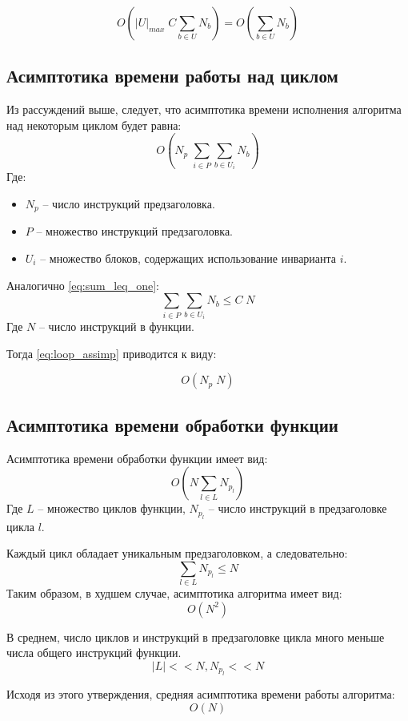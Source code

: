 $$ O(|U|_{max} \; C \sum_{b \in U} N_b) = O(\sum_{b \in U} N_b) $$

\subsection{Асимптотика времени работы над циклом}

Из рассуждений выше, следует, что асимптотика времени исполнения алгоритма над некоторым циклом будет равна:
\begin{equation} \label{eq:loop_assimp}
O(N_p \; \sum_{i \in P} {\sum_{b \in U_i} N_b})
\end{equation}
Где:
\begin{itemize}
    \item $N_p$ -- число инструкций предзаголовка.
    \item $P$ -- множество инструкций предзаголовка.
    \item $U_i$ -- множество блоков, содержащих использование инварианта $i$.
\end{itemize}

Аналогично \ref{eq:sum_leq_one}:
$$ \sum_{i \in P} {\sum_{b \in U_i} N_b} \leq C \; N $$
Где $N$ -- число инструкций в функции.

Тогда \ref{eq:loop_assimp} приводится к виду:

$$ O(N_p \; N) $$

\subsection{Асимптотика времени обработки функции}

Асимптотика времени обработки функции имеет вид:
\begin{equation} \label{eq:assimp}
O(N \sum_{l \in L} N_{p_l})
\end{equation}
Где $L$ -- множество циклов функции, $N_{p_l}$ -- число инструкций в предзаголовке цикла $l$.

Каждый цикл обладает уникальным предзаголовком, а следовательно:
$$ \sum_{l \in L} N_{p_l} \leq N $$
Таким образом, в худшем случае, асимптотика алгоритма имеет вид:
\begin{equation} \label{eq:assimp_worst}
O(N^2)
\end{equation}

В среднем, число циклов и инструкций в предзаголовке цикла много меньше числа общего инструкций функции.
$$ |L| << N, N_{p_l} << N $$

Исходя из этого утверждения, средняя асимптотика времени работы алгоритма:
\begin{equation} \label{eq:assimp_avg}
O(N)
\end{equation}

